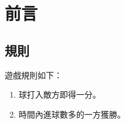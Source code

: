\chapter{前言}
\renewcommand{\baselinestretch}{10.0} %
\setcounter{page}{1}  %
\fontsize{14pt}{2.5pt}\sectionef
\section{規則}
遊戲規則如下：
\begin{enumerate}
\item 球打入敵方即得一分。
\item 時間內進球數多的一方獲勝。
\end{enumerate}
\renewcommand{\baselinestretch}{0.5} %